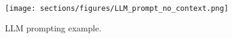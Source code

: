

\begin{figure}[tbp]
\captionsetup{font=scriptsize}
  \texttt{[image: sections/figures/LLM\_prompt\_no\_context.png]}
\setlength{\belowcaptionskip}{-15pt}
\caption{LLM prompting example.}
\label{fig:llm_prompts}
\end{figure}

